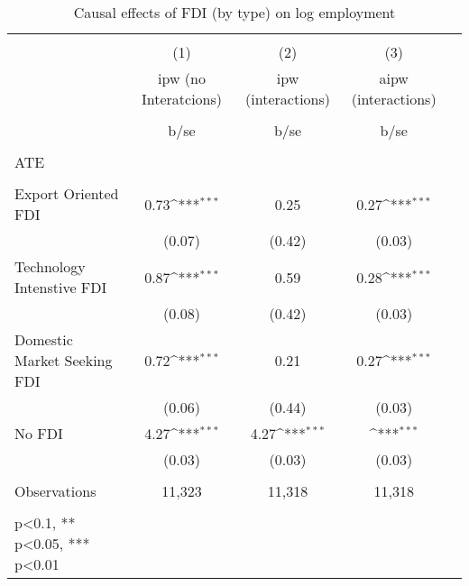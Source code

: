 \begin{table}
	\def\sym#1{\ifmmode^{#1}\else\(^{#1}\)\fi}
	\caption{Causal effects of FDI (by type) on log employment}
	\label{4_table1}
	\begin{tabular}{l*{1}{cccc}}
		\hline\hline
		&\multicolumn{4}{c}{}                                        \\
		& (1) & (2) & (3)    \\
		\
		&ipw (no Interatcions) & ipw (interactions) & aipw (interactions)    \\
		\\
		&b/se&b/se& b/se       \\
		\hline
		\\
		ATE \\
		\\
		Export Oriented FDI &       0.73\sym{***} &  0.25  &   0.27\sym{***} \\
		&     (0.07)&     (0.42)&   (0.03)        \\
		Technology Intenstive FDI&       0.87\sym{***}&       0.59 &       0.28\sym{***}\\
		&     (0.08)&     (0.42)& (0.03)          \\
		Domestic Market Seeking FDI&       0.72\sym{***}&       0.21 &      0.27\sym{***}\\
		&     (0.06)&     (0.44)&     (0.03)   \\
		No FDI &       4.27\sym{***}&       4.27\sym{***} &      \sym{***}\\
		&     (0.03)&     (0.03)&     (0.03)   \\
		\hline
		\\
		Observations        &       11,323 &      11,318      &   11,318                  &            \\
		\hline\hline
		\\
		\small * p<0.1, ** p<0.05, *** p<0.01
	\end{tabular} \\
\end{table}


